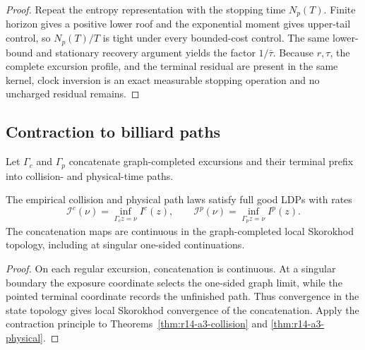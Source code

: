 \begin{proof}
Repeat the entropy representation with the stopping time \(N_p(T)\).
Finite horizon gives a positive lower roof and the exponential moment gives
upper-tail control, so \(N_p(T)/T\) is tight under every bounded-cost control.
The same lower-bound and stationary recovery argument yields the factor
\(1/\bar\tau\).  Because \(r,\tau\), the complete excursion profile, and the
terminal residual are present in the same kernel, clock inversion is an exact
measurable stopping operation and no uncharged residual remains.
\end{proof}

\subsection{Contraction to billiard paths}

Let \(\Gamma_c\) and \(\Gamma_p\) concatenate graph-completed excursions and
their terminal prefix into collision- and physical-time paths.

\begin{theorem}
\label{thm:r14-a3-main}
The empirical collision and physical path laws satisfy full good LDPs with
rates
\[
 \mathcal I^c(\nu)=\inf_{\Gamma_c z=\nu}I^c(z),
 \qquad
 \mathcal I^p(\nu)=\inf_{\Gamma_p z=\nu}I^p(z).
\]
The concatenation maps are continuous in the graph-completed local
Skorokhod topology, including at singular one-sided continuations.
\end{theorem}

\begin{proof}
On each regular excursion, concatenation is continuous.  At a singular
boundary the exposure coordinate selects the one-sided graph limit, while the
pointed terminal coordinate records the unfinished path.  Thus convergence
in the state topology gives local Skorokhod convergence of the concatenation.
Apply the contraction principle to
Theorems~\ref{thm:r14-a3-collision} and
\ref{thm:r14-a3-physical}.
\end{proof}
